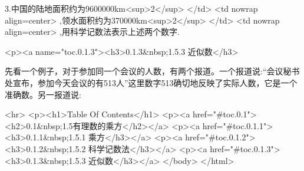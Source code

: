 3.中国的陆地面积约为9600000km<sup>2</sup>
</td>
<td nowrap align=center>
  ,领水面积约为370000km<sup>2</sup>
</td>
<td nowrap align=center>
  ,用科学记数法表示上述两个数字.

\endexercise

<p><a name="toc.0.1.3"><h3>0.1.3&nbsp;1.5.3 近似数</h3>

先看一个例子，对于参加同一个会议的人数，有两个报道。一个报道说:“会议秘书处宣布，参加今天会议的有513人”这里数字513确切地反映了实际人数，它是一个准确数。另一报道说: 

\enddocument
<hr>
<p><h1>Table Of Contents</h1>
<p><a href="#toc.0.1"><h2>0.1&nbsp;1.5有理数的乘方</h2></a>
<p><a href="#toc.0.1.1"><h3>0.1.1&nbsp;1.5.1 乘方</h3></a>
<p><a href="#toc.0.1.2"><h3>0.1.2&nbsp;1.5.2 科学记数法</h3></a>
<p><a href="#toc.0.1.3"><h3>0.1.3&nbsp;1.5.3 近似数</h3></a>
</body>
</html>
